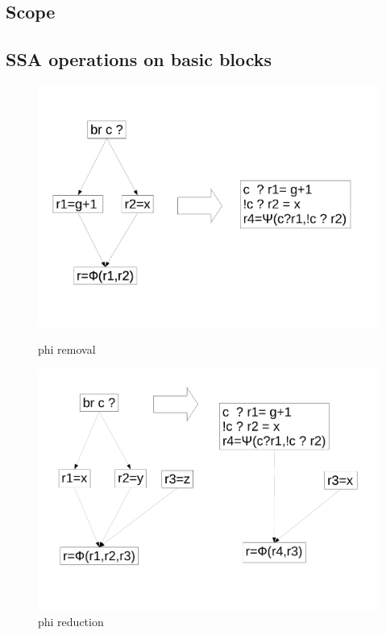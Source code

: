     \subsection{Scope}

    \subsection{SSA operations on basic blocks}

\begin{figure}
\begin{minipage}[t]{5cm}
\includegraphics[scale=0.2]{phi_removal.pdf}
\caption{phi removal}
\end{minipage}
\begin{minipage}[t]{5cm}
\includegraphics[scale=0.2]{phi_reduction.pdf}
\caption{phi reduction}

\end{minipage}
\end{figure}
